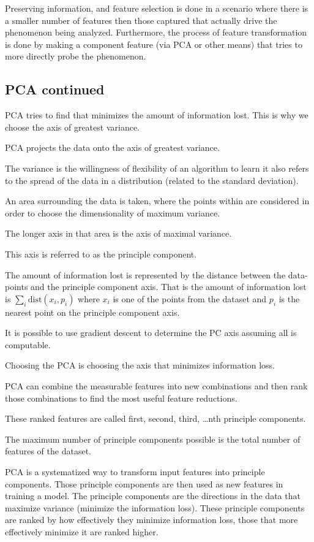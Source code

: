 \documentclass{article}
\begin{document}
Preserving information, and feature selection is done in a scenario where there
is a smaller number of features then those captured that actually drive the 
phenomenon being analyzed. Furthermore, the process of feature transformation 
is done by making a component feature (via PCA or other means) that tries to
more directly probe the phenomenon. 

\subsection{PCA continued}

PCA tries to find that minimizes the amount of information lost. This is why we 
choose the axis of greatest variance. 

PCA projects the data onto the axis of greatest variance. 

The variance is the willingness of flexibility of an algorithm to learn
it also refers to the spread of the data in a distribution (related to the 
standard deviation). 

An area surrounding the data is taken, where the points within are considered 
in order to choose the dimensionality of maximum variance. 

The longer axis in that area is the axis of maximal variance. 

This axis is referred to as the principle component. 

The amount of information lost is represented by the distance between the 
data-points and the principle component axis. That is the amount of information
lost is $\sum_i \text{dist}(x_i, p_i)$ where $x_i$ is one of the points from the 
dataset and $p_i$ is the nearest point on the principle component axis. 

It is possible to use gradient descent to determine the PC axis assuming all 
is computable. 

Choosing the PCA is choosing the axis that minimizes information loss. 


PCA can combine the measurable features into new combinations and then rank 
those combinations to find the most useful feature reductions. 

These ranked features are called first, second, third, \ldots nth principle
components. 

The maximum number of principle components possible is the total number of
features of the dataset. 

PCA is a systematized way to transform input features into principle components. 
Those principle components are then used as new features in training a model. 
The principle components are the directions in the data that maximize variance 
(minimize the information loss). These principle components are ranked by how
effectively they minimize information loss, those that more effectively minimize
it are ranked higher. 
\end{document}
